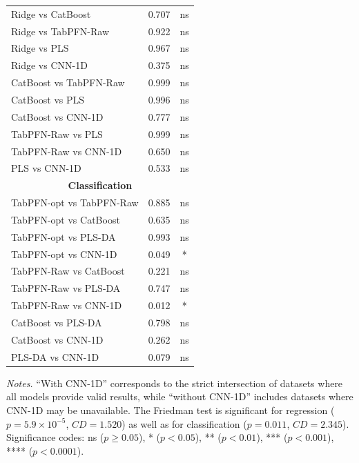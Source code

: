 \documentclass{article}
\begin{document}
\begin{table}[!htbp]
\begin{tabular}{lcc}
Ridge vs CatBoost        & 0.707 & ns \\
Ridge vs TabPFN-Raw      & 0.922 & ns \\
Ridge vs PLS             & 0.967 & ns \\
Ridge vs CNN-1D          & 0.375 & ns \\

CatBoost vs TabPFN-Raw   & 0.999 & ns \\
CatBoost vs PLS          & 0.996 & ns \\
CatBoost vs CNN-1D       & 0.777 & ns \\

TabPFN-Raw vs PLS        & 0.999 & ns \\
TabPFN-Raw vs CNN-1D     & 0.650 & ns \\

PLS vs CNN-1D            & 0.533 & ns \\

\midrule
\multicolumn{3}{c}{\textbf{Classification}} \\
\midrule
TabPFN-opt vs TabPFN-Raw & 0.885 & ns \\
TabPFN-opt vs CatBoost   & 0.635 & ns \\
TabPFN-opt vs PLS-DA     & 0.993 & ns \\
TabPFN-opt vs CNN-1D     & 0.049 & * \\

TabPFN-Raw vs CatBoost   & 0.221 & ns \\
TabPFN-Raw vs PLS-DA     & 0.747 & ns \\
TabPFN-Raw vs CNN-1D     & 0.012 & * \\

CatBoost vs PLS-DA       & 0.798 & ns \\
CatBoost vs CNN-1D       & 0.262 & ns \\

PLS-DA vs CNN-1D         & 0.079 & ns \\

\bottomrule
\end{tabular}

\vspace{0.4em}
\begin{minipage}{0.95\linewidth}
\footnotesize
\textit{Notes.} ``With CNN-1D'' corresponds to the strict intersection of datasets where all models provide valid results, while ``without CNN-1D'' includes datasets where CNN-1D may be unavailable. The Friedman test is significant for regression ($p = 5.9 \times 10^{-5}$, $CD = 1.520$) as well as for classification ($p = 0.011$, $CD = 2.345$). Significance codes: ns ($p \geq 0.05$), * ($p < 0.05$), ** ($p < 0.01$), *** ($p < 0.001$), **** ($p < 0.0001$).
\end{minipage}
\end{table}
\end{document}
